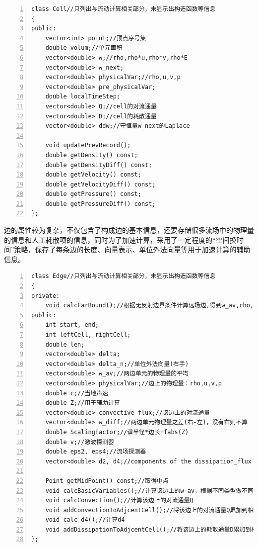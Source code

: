 \documentclass[UTF8]{ctexart}
\begin{document}
\begin{lstlisting}[numbers=left, numberstyle=\tiny, keywordstyle=\color{blue!70}, commentstyle=\color{red!50!green!50!blue!50}, frame=shadowbox, rulesepcolor=\color{red!20!green!20!blue!20}]
class Cell//只列出与流动计算相关部分，未显示出构造函数等信息
{
public:
	vector<int> point;//顶点序号集
	double volum;//单元面积
	vector<double> w;//rho,rho*u,rho*v,rho*E
	vector<double> w_next;
	vector<double> physicalVar;//rho,u,v,p
	vector<double> pre_physicalVar;
	double localTimeStep;
	vector<double> Q;//cell的对流通量
	vector<double> D;//cell的耗散通量
	vector<double> ddw;//守恒量w_next的Laplace

	void updatePrevRecord();
	double getDensity() const;
	double getDensityDiff() const;
	double getVelocity() const;
	double getVelocityDiff() const;
	double getPressure() const;
	double getPressureDiff() const;
};
\end{lstlisting}

\indent 边的属性较为复杂，不仅包含了构成边的基本信息，还要存储很多流场中的物理量的信息和人工耗散项的信息，同时为了加速计算，采用了一定程度的“空间换时间”策略，保存了每条边的长度、向量表示、单位外法向量等用于加速计算的辅助信息。

\begin{lstlisting}[numbers=left, numberstyle=\tiny, keywordstyle=\color{blue!70}, commentstyle=\color{red!50!green!50!blue!50}, frame=shadowbox, rulesepcolor=\color{red!20!green!20!blue!20}]
class Edge//只列出与流动计算相关部分，未显示出构造函数等信息
{
private:
	void calcFarBound();//根据无反射边界条件计算远场边,得到w_av,rho,u,v,p,c
public:
	int start, end;
	int leftCell, rightCell;
	double len;
	vector<double> delta;
	vector<double> delta_n;//单位外法向量(右手)
	vector<double> w_av;//两边单元的物理量的平均
	vector<double> physicalVar;//边上的物理量：rho,u,v,p
	double c;//当地声速
	double Z;//用于辅助计算
	vector<double> convective_flux;//该边上的对流通量
	vector<double> w_diff;//两边单元物理量之差(右-左)，没有右则不算
	double ScalingFactor;//谱半径*边长+fabs(Z)
	double v;//激波探测器
	double eps2, eps4;//流场探测器
	vector<double> d2, d4;//components of the dissipation_flux

	Point getMidPoint() const;//取得中点
	void calcBasicVariables();//计算该边上的w_av，根据不同类型做不同处理
	void calcConvection();//计算该边上的对流通量Q
	void addConvectionToAdjcentCell();//将该边上的对流通量Q累加到相关联的cell
	void calc_d4();//计算d4
	void addDissipationToAdjcentCell();//将该边上的耗散通量D累加到相关联的cell
};
\end{lstlisting}
\end{document}
